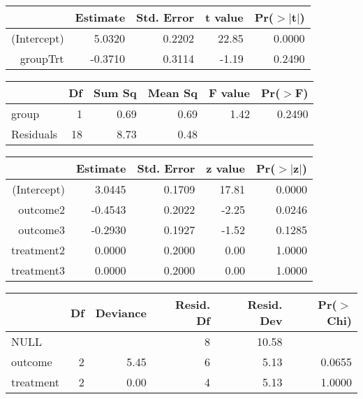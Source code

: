 \begin{table}[ht]
\begin{center}
\begin{tabular}{rrrrr}
  \hline
 & Estimate & Std. Error & t value & Pr($>$$|$t$|$) \\ 
  \hline
(Intercept) & 5.0320 & 0.2202 & 22.85 & 0.0000 \\ 
  groupTrt & -0.3710 & 0.3114 & -1.19 & 0.2490 \\ 
   \hline
\end{tabular}
\end{center}
\end{table}
\begin{table}[ht]
\begin{center}
\begin{tabular}{lrrrrr}
  \hline
 & Df & Sum Sq & Mean Sq & F value & Pr($>$F) \\ 
  \hline
group & 1 & 0.69 & 0.69 & 1.42 & 0.2490 \\ 
  Residuals & 18 & 8.73 & 0.48 &  &  \\ 
   \hline
\end{tabular}
\end{center}
\end{table}
\begin{table}[ht]
\begin{center}
\begin{tabular}{rrrrr}
  \hline
 & Estimate & Std. Error & z value & Pr($>$$|$z$|$) \\ 
  \hline
(Intercept) & 3.0445 & 0.1709 & 17.81 & 0.0000 \\ 
  outcome2 & -0.4543 & 0.2022 & -2.25 & 0.0246 \\ 
  outcome3 & -0.2930 & 0.1927 & -1.52 & 0.1285 \\ 
  treatment2 & 0.0000 & 0.2000 & 0.00 & 1.0000 \\ 
  treatment3 & 0.0000 & 0.2000 & 0.00 & 1.0000 \\ 
   \hline
\end{tabular}
\end{center}
\end{table}
\begin{table}[ht]
\begin{center}
\begin{tabular}{lrrrrr}
  \hline
 & Df & Deviance & Resid. Df & Resid. Dev & Pr($>$Chi) \\ 
  \hline
NULL &  &  & 8 & 10.58 &  \\ 
  outcome & 2 & 5.45 & 6 & 5.13 & 0.0655 \\ 
  treatment & 2 & 0.00 & 4 & 5.13 & 1.0000 \\ 
   \hline
\end{tabular}
\end{center}
\end{table}

